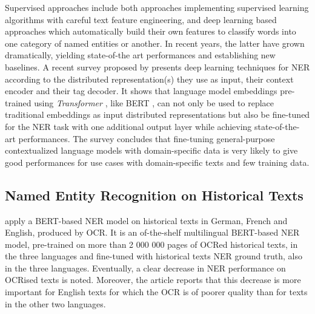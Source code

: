 Supervised approaches include both approaches implementing supervised learning algorithms with careful text feature engineering, and deep learning based approaches which automatically build their own features to classify words into one category of named entities or another. In recent years, the latter have grown dramatically, yielding state-of-the art performances and establishing new baselines\cite{li2020}. A recent survey proposed by \cite{li2020} presents deep learning techniques for NER according to the distributed representation(s) they use as input, their context encoder and their tag decoder. It shows that language model embeddings pre-trained using \textit{Transformer} \cite{vaswani2017attention}, like BERT \cite{devlin2018bert}, can not only be used to replace traditional embeddings as input distributed representations but also be fine-tuned for the NER task with one additional output layer while achieving state-of-the-art performances. The survey concludes that fine-tuning general-purpose contextualized language models with domain-specific data is very likely to give good performances for use cases with domain-specific texts and few training data.

\subsection{Named Entity Recognition on Historical Texts}

\cite{Labusch2020NamedED} apply a BERT-based NER model on historical texts in German, French and English, produced by OCR. It is an of-the-shelf multilingual BERT-based NER model, pre-trained on more than 2 000 000 pages of OCRed historical texts, in the three languages and fine-tuned with historical texts NER ground truth, also in the three languages. Eventually, a clear decrease in NER performance on OCRised texts is noted. Moreover, the article reports that this decrease is more important for English texts for which the OCR is of poorer quality than for texts in the other two languages. 

